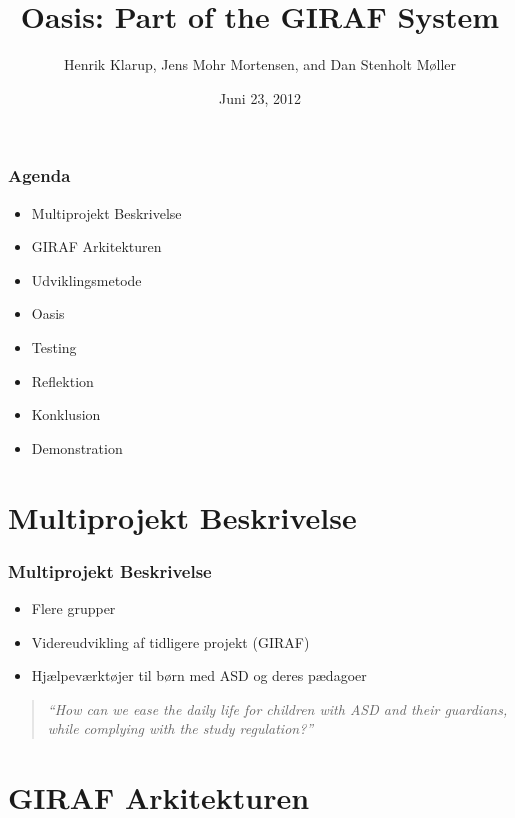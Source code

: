 \documentclass{beamer}
\title{Oasis: Part of the GIRAF System}
\author{Henrik Klarup, Jens Mohr Mortensen, and Dan Stenholt M\o{}ller}
\institute[AAU]{Aalborg University}
\date{Juni 23, 2012}
\begin{document}
\begin{frame}
	\titlepage
\end{frame}

\begin{frame}
	\frametitle{Agenda}
	\begin{itemize}
		\item Multiprojekt Beskrivelse
		\item GIRAF Arkitekturen
		\item Udviklingsmetode
		\item Oasis
		\item Testing
		\item Reflektion
		\item Konklusion
		\item Demonstration
	\end{itemize}
\end{frame}

\section{Multiprojekt Beskrivelse}

\begin{frame}
	\frametitle{Multiprojekt Beskrivelse}
	\begin{itemize}
		\item Flere grupper
		\item Videreudvikling af tidligere projekt (GIRAF)
		\item Hj\ae{}lpev\ae{}rkt\o{}jer til b\o{}rn med ASD og deres p\ae{}dagoer
	\end{itemize}
	\begin{quote}
		\textit{``How can we ease the daily life for children with ASD and their guardians, while complying with the study regulation?''}
	\end{quote}
\end{frame}

\section{GIRAF Arkitekturen}
\end{document}
